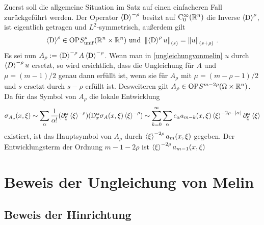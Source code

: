 Zuerst soll die allgemeine Situation im Satz auf einen einfacheren Fall zurückgeführt werden. Der Operator $\braket{\mathrm D}^{-\rho}$ besitzt auf $\mathrm C^\infty_0(\mathbb R^n)$ die Inverse $\braket{\mathrm D}^{\rho}$, ist eigentlich getragen und $L^2$-symmetrisch, außerdem gilt
\begin{align*}
\braket{\mathrm D}^\rho\in\mathrm{OP} S_\mathrm{unif}^\rho(\mathbb R^n\times\mathbb R^n)\text{ und }\left\lVert\braket{\mathrm D}^\rho u\right\rVert_{(s)}=\left\lVert u\right\rVert_{(s+\rho)}\,.
\end{align*}
Es sei nun $A_\rho:=\braket{\mathrm D}^{-\rho}A\braket{\mathrm D}^{-\rho}$. Wenn man in \eqref{ungleichungvonmelin} $u$ durch $\braket{D}^{-\rho}u$ ersetzt, so wird ersichtlich, dass die Ungleichung für $A$ und $\mu=(m-1)/2$ genau dann erfüllt ist, wenn sie für $A_\rho$ mit $\mu=(m-\rho-1)/2$ und $s$ ersetzt durch $s-\rho$ erfüllt ist. Desweiteren gilt $A_\rho\in \mathrm{OP}S^{m-2\rho}(\Omega\times\mathbb R^n)$. Da für das Symbol von $A_\rho$ die lokale  Entwicklung
\begin{align*}
\sigma_{A_\rho}(x,\xi) \sim \sum_{\alpha}\frac 1 {\alpha!} (\partial_\xi^\alpha\braket{\xi}^{-\rho})(\mathrm D_x^\alpha \sigma_{A}(x,\xi)\braket{\xi}^{-\rho}) \sim \sum_{k=0}^\infty\sum_{\alpha} c_\alpha a_{m-k}(x,\xi)\braket{\xi}^{-2\rho-\lvert\alpha\rvert}\partial^\alpha_\xi\braket{\xi}
\end{align*}
existiert, ist das Hauptsymbol von $A_\rho$ durch $\braket{\xi}^{-2\rho}a_m(x,\xi)$ gegeben. Der Entwicklungsterm der Ordnung $m-1-2\rho$ ist $\braket{\xi}^{-2\rho}a_{m-1}(x,\xi)$

\section{Beweis der Ungleichung von Melin}

\subsection{Beweis der Hinrichtung}

